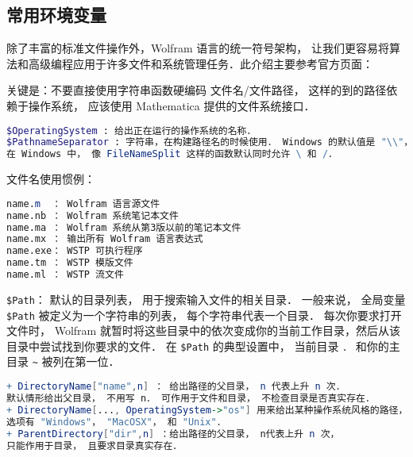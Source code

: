 
\begin{issues}
\issueDraft
\issueTODO
\end{issues}

\subsection{常用环境变量}

除了丰富的标准文件操作外，Wolfram 语言的统一符号架构，
让我们更容易将算法和高级编程应用于许多文件和系统管理任务．此介绍主要参考官方页面：


关键是：不要直接使用字符串函数硬编码 文件名/文件路径， 
这样的到的路径依赖于操作系统， 应该使用 Mathematica 提供的文件系统接口．

\begin{lstlisting}[language=mathematica]
$OperatingSystem : 给出正在运行的操作系统的名称．
$PathnameSeparator : 字符串，在构建路径名的时候使用． Windows 的默认值是 "\\"， 其他系统是 "/"．
在 Windows 中， 像 FileNameSplit 这样的函数默认同时允许 \ 和 /．
\end{lstlisting}

文件名使用惯例：

\begin{lstlisting}[language=mathematica]
name.m  ： Wolfram 语言源文件
name.nb ： Wolfram 系统笔记本文件
name.ma ： Wolfram 系统从第3版以前的笔记本文件
name.mx ： 输出所有 Wolfram 语言表达式
name.exe： WSTP 可执行程序
name.tm ： WSTP 模版文件
name.ml ： WSTP 流文件
\end{lstlisting}


\verb`$Path`： 默认的目录列表， 用于搜索输入文件的相关目录． 
一般来说， 全局变量 \verb`$Path` 被定义为一个字符串的列表， 每个字符串代表一个目录．
每次你要求打开文件时， Wolfram 就暂时将这些目录中的依次变成你的当前工作目录，然后从该目录中尝试找到你要求的文件．
在 \verb`$Path` 的典型设置中， 当前目录 \verb`．` 和你的主目录 \verb`~` 被列在第一位．

\begin{lstlisting}[language=mathematica]
+ DirectoryName["name",n] ： 给出路径的父目录， n 代表上升 n 次． 
默认情形给出父目录， 不用写 n． 可作用于文件和目录， 不检查目录是否真实存在．
+ DirectoryName[..., OperatingSystem->"os"] 用来给出某种操作系统风格的路径， 
选项有 "Windows"， "MacOSX"， 和 "Unix"．
+ ParentDirectory["dir",n] ：给出路径的父目录， n代表上升 n 次， 
只能作用于目录， 且要求目录真实存在．
\end{lstlisting}

